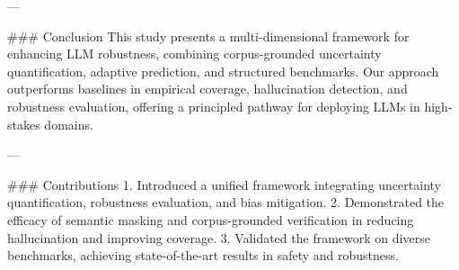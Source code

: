---

### Conclusion  
This study presents a multi-dimensional framework for enhancing LLM robustness, combining corpus-grounded uncertainty quantification, adaptive prediction, and structured benchmarks. Our approach outperforms baselines in empirical coverage, hallucination detection, and robustness evaluation, offering a principled pathway for deploying LLMs in high-stakes domains.  

---

### Contributions  
1. Introduced a unified framework integrating uncertainty quantification, robustness evaluation, and bias mitigation.  
2. Demonstrated the efficacy of semantic masking and corpus-grounded verification in reducing hallucination and improving coverage.  
3. Validated the framework on diverse benchmarks, achieving state-of-the-art results in safety and robustness.  